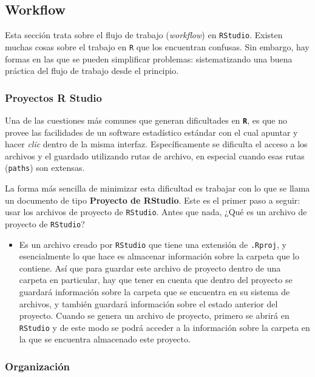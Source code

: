 \documentclass[
]{article}
\providecommand{\tightlist}{%
  \setlength{\itemsep}{0pt}\setlength{\parskip}{0pt}}
\begin{document}
\hypertarget{workflow}{%
\subsection{Workflow}\label{workflow}}

Esta sección trata sobre el flujo de trabajo (\emph{workflow}) en \texttt{RStudio}. Existen muchas cosas sobre el trabajo en \texttt{R} que los encuentran confusas. Sin embargo, hay formas en las que se pueden simplificar problemas: sistematizando una buena práctica del flujo de trabajo desde el principio.

\hypertarget{proyectos-r-studio}{%
\subsubsection{Proyectos R Studio}\label{proyectos-r-studio}}

Una de las cuestiones más comunes que generan dificultades en \textbf{\texttt{R}}, es que no provee las facilidades de un software estadístico estándar con el cual apuntar y hacer \emph{clic} dentro de la misma interfaz. Específicamente se dificulta el acceso a los archivos y el guardado utilizando rutas de archivo, en especial cuando esas rutas (\texttt{paths}) son extensas.

La forma más sencilla de minimizar esta dificultad es trabajar con lo que se llama un documento de tipo \textbf{Proyecto de RStudio}. Este es el primer paso a seguir: usar los archivos de proyecto de \texttt{RStudio}. Antes que nada, ¿Qué es un archivo de proyecto de \texttt{RStudio}?

\begin{itemize}
\tightlist
\item
  Es un archivo creado por \texttt{RStudio} que tiene una extensión de \texttt{.Rproj}, y esencialmente lo que hace es almacenar información sobre la carpeta que lo contiene. Así que para guardar este archivo de proyecto dentro de una carpeta en particular, hay que tener en cuenta que dentro del proyecto se guardará información sobre la carpeta que se encuentra en su sistema de archivos, y también guardará información sobre el estado anterior del proyecto. Cuando se genera un archivo de proyecto, primero se abrirá en \texttt{RStudio} y de este modo se podrá acceder a la información sobre la carpeta en la que se encuentra almacenado este proyecto.
\end{itemize}

\hypertarget{organizaciuxf3n}{%
\subsubsection{Organización}\label{organizaciuxf3n}}
\end{document}
